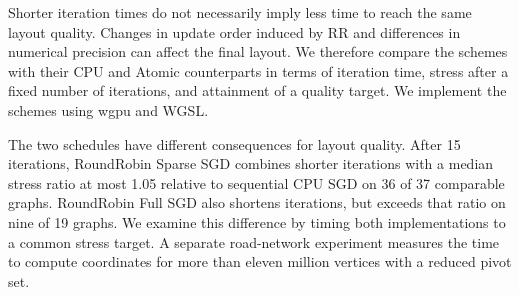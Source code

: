 Shorter iteration times do not necessarily imply less time to reach the same layout quality.
Changes in update order induced by RR and differences in numerical precision can affect the final layout.
We therefore compare the schemes with their CPU and Atomic counterparts in terms of iteration time, stress after a fixed number of iterations, and attainment of a quality target.
We implement the schemes using wgpu and WGSL.

The two schedules have different consequences for layout quality. After 15 iterations, RoundRobin Sparse SGD combines shorter iterations with a median stress ratio at most 1.05 relative to sequential CPU SGD on 36 of 37 comparable graphs. RoundRobin Full SGD also shortens iterations, but exceeds that ratio on nine of 19 graphs. We examine this difference by timing both implementations to a common stress target. A separate road-network experiment measures the time to compute coordinates for more than eleven million vertices with a reduced pivot set.
